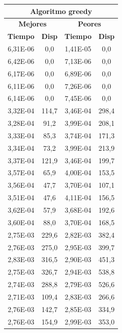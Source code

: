 \begin{figure}[h]
    \centering
	\begin{minipage}[l]{0.48\textwidth}
	    \begin{tabular}{|c|c|c|c|}
	        \hline
	        \multicolumn{4}{|c|}{\textbf{Algoritmo greedy}} \\
	        \hline
	        \multicolumn{2}{|c|}{\textbf{Mejores}} & \multicolumn{2}{|c|}{\textbf{Peores}}\\
	        \hline
	        \textbf{Tiempo} & \textbf{Disp} & \textbf{Tiempo} & \textbf{Disp}\\
	        \hline
	        6,31E-06 & 0,0 & 1,41E-05 & 0,0\\
            6,42E-06 & 0,0 & 7,13E-06 & 0,0\\
            6,17E-06 & 0,0 & 6,89E-06 & 0,0\\
            6,11E-06 & 0,0 & 7,26E-06 & 0,0\\
            6,14E-06 & 0,0 & 7,45E-06 & 0,0\\
            3,32E-04 & 114,7 & 3,46E-04 & 298,4\\
            3,28E-04 & 91,2 & 3,99E-04 & 208,1\\
            3,33E-04 & 85,3 & 3,74E-04 & 171,3\\
            3,34E-04 & 73,2 & 3,99E-04 & 213,9\\
            3,37E-04 & 121,9 & 3,46E-04 & 199,7\\
            3,57E-04 & 65,9 & 4,00E-04 & 153,5\\
            3,56E-04 & 47,7 & 3,70E-04 & 107,1\\
            3,51E-04 & 47,6 & 4,11E-04 & 156,5\\
            3,62E-04 & 57,9 & 3,68E-04 & 192,6\\
            3,60E-04 & 88,0 & 3,70E-04 & 168,5\\
            2,75E-03 & 229,6 & 2,82E-03 & 382,4\\
            2,76E-03 & 275,0 & 2,95E-03 & 399,7\\
            2,83E-03 & 316,5 & 2,90E-03 & 451,3\\
            2,75E-03 & 326,7 & 2,94E-03 & 538,8\\
            2,74E-03 & 288,8 & 2,79E-03 & 526,6\\
            2,71E-03 & 109,4 & 2,83E-03 & 266,6\\
            2,76E-03 & 142,7 & 2,85E-03 & 334,9\\
            2,76E-03 & 154,9 & 2,99E-03 & 353,0\\

\end{tabular}
\end{minipage}
\end{figure}
